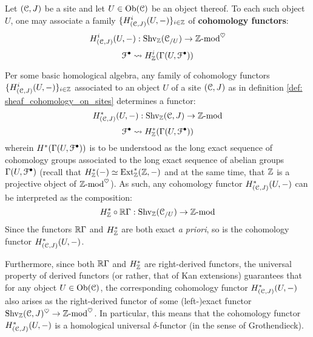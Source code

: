             \begin{definition} \label{def: sheaf_cohomology_on_sites}
                Let $(\mathcal{C}, J)$ be a site and let $U \in \mathrm{Ob}(\mathcal{C})$ be an object thereof. To each such object $U$, one may associate a family $\{H^i_{(\mathcal{C}, J)}(U, -)\}_{i \in \mathbb{Z}}$ of \textbf{cohomology functors}:
                    $$H^i_{(\mathcal{C}, J)}(U, -): \mathrm{Shv}_{\mathbb{Z}}(\mathcal{C}_{/U}) \to \mathbb{Z}\text{-}\mathrm{mod}^{\heartsuit}$$
                    $$\mathcal{F}^{\bullet} \leadsto H^i_{\mathbb{Z}}(\Gamma(U, \mathcal{F}^{\bullet}))$$
            \end{definition}
            \begin{remark} \label{remark: cohomology_functors_are_exact}
                Per some basic homological algebra, any family of cohomology functors $\{H^i_{(\mathcal{C}, J)}(U, -)\}_{i \in \mathbb{Z}}$ associated to an object $U$ of a site $(\mathcal{C}, J)$ as in definition \ref{def: sheaf_cohomology_on_sites} determines a functor:
                    $$H^*_{(\mathcal{C}, J)}(U, -): \mathrm{Shv}_{\mathbb{Z}}(\mathcal{C}, J) \to \mathbb{Z}\text{-}\mathrm{mod}$$
                    $$\mathcal{F}^{\bullet} \leadsto H^*_{\mathbb{Z}}(\Gamma(U, \mathcal{F}^{\bullet}))$$
                wherein $H^*(\Gamma(U, \mathcal{F}^{\bullet}))$ is to be understood as the long exact sequence of cohomology groups associated to the long exact sequence of abelian groups $\Gamma(U, \mathcal{F}^{\bullet})$ (recall that $H^*_{\mathbb{Z}}(-) \simeq \mathrm{Ext}^*_{\mathbb{Z}}(\mathbb{Z}, -)$ and at the same time, that $\mathbb{Z}$ is a projective object of $\mathbb{Z}\text{-}\mathrm{mod}^{\heartsuit}$). As such, any cohomology functor $H^*_{(\mathcal{C}, J)}(U, -)$ can be interpreted as the composition:
                    $$H^*_{\mathbb{Z}} \circ \mathbb{R}\Gamma: \mathrm{Shv}_{\mathbb{Z}}(\mathcal{C}_{/U}) \to \mathbb{Z}\text{-}\mathrm{mod}$$
                Since the functors $\mathbb{R}\Gamma$ and $H^*_{\mathbb{Z}}$ are both exact \textit{a priori}, so is the cohomology functor $H^*_{(\mathcal{C}, J)}(U, -)$. 
                
                Furthermore, since both $\mathbb{R}\Gamma$ and $H^*_{\mathbb{Z}}$ are right-derived functors, the universal property of derived functors (or rather, that of Kan extensions) guarantees that for any object $U \in \mathrm{Ob}(\mathcal{C})$, the corresponding cohomology functor $H^*_{(\mathcal{C}, J)}(U, -)$ also arises as the right-derived functor of some (left-)exact functor $\mathrm{Shv}_{\mathbb{Z}}(\mathcal{C}, J)^{\heartsuit} \to \mathbb{Z}\text{-}\mathrm{mod}^{\heartsuit}$. In particular, this means that the cohomology functor $H^*_{(\mathcal{C}, J)}(U, -)$ is a homological universal $\delta$-functor (in the sense of Grothendieck).
            \end{remark}
